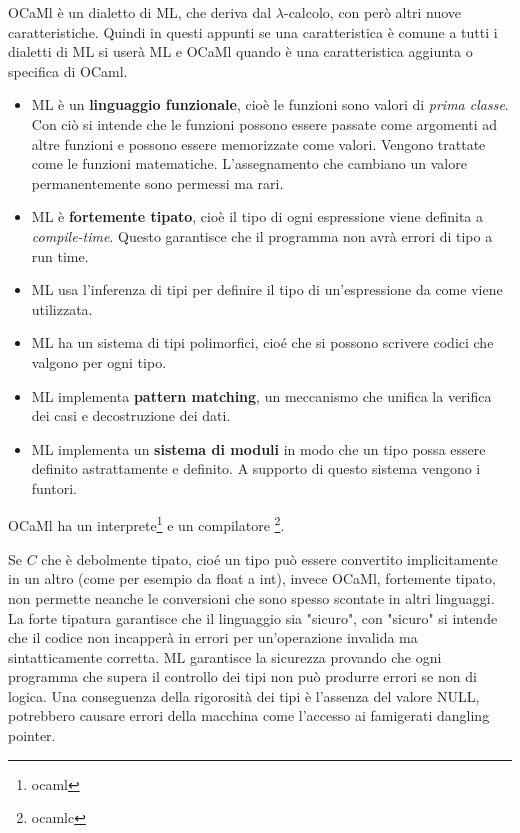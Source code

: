 \documentclass{article}
\begin{document}
\hspace*{0.5cm} OCaMl è un dialetto di ML, che deriva dal $\lambda$-calcolo, con però altri nuove caratteristiche.
Quindi in questi appunti se una caratteristica è comune a tutti i dialetti di ML si userà ML e OCaMl quando è una caratteristica aggiunta o specifica di OCaml.

\vspace*{0.5cm}


\begin{itemize}
  \item ML è un \textbf{linguaggio funzionale}, cioè le funzioni sono valori di \textit{prima classe}.
    Con ciò si intende che le funzioni possono essere passate come argomenti ad altre funzioni e possono essere memorizzate come valori.
    Vengono trattate come le funzioni matematiche.
    L'assegnamento che cambiano un valore permanentemente sono permessi ma rari.

  \item ML è \textbf{fortemente tipato}, cioè il tipo di ogni espressione viene definita a \textit{compile-time}. Questo garantisce che il programma non avrà errori di tipo a run time.

  \item ML usa l'inferenza di tipi per definire il tipo di un'espressione da come viene utilizzata.

  \item ML ha un sistema di tipi polimorfici, cioé che si possono scrivere codici che valgono per ogni tipo.

  \item ML implementa \textbf{pattern matching}, un meccanismo che unifica la verifica dei casi e decostruzione dei dati.

  \item ML implementa un \textbf{sistema di moduli} in modo che un tipo possa essere definito astrattamente e definito. 
    A supporto di questo sistema vengono i funtori.   
\end{itemize}

\hspace*{0.5cm}OCaMl ha un interprete\footnote{ocaml} e un compilatore \footnote{ocamlc}.

\vspace*{0.5cm}

\hspace*{0.5cm}Se $C$ che è debolmente tipato, cioé un tipo può essere convertito implicitamente in un altro (come per esempio da float a int), invece OCaMl, fortemente tipato, non permette neanche le conversioni che sono spesso scontate in altri linguaggi.
La forte tipatura garantisce che il linguaggio sia "sicuro", con "sicuro" si intende che il codice non incapperà in errori per un'operazione invalida ma sintatticamente corretta.
ML garantisce la sicurezza provando che ogni programma che supera il controllo dei tipi non può produrre errori se non di logica.
Una conseguenza della rigorosità dei tipi è l'assenza del valore NULL, potrebbero causare errori della macchina come l'accesso ai famigerati dangling pointer.
\end{document}
